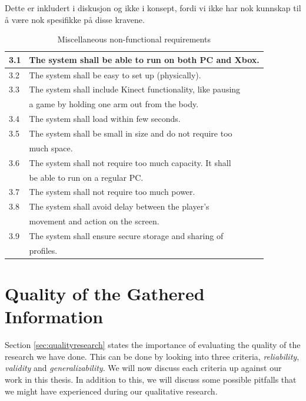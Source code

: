 Dette er inkludert i diskusjon og ikke i konsept, fordi vi ikke har nok kunnskap til å være nok spesifikke på disse kravene. 

\begin{table} [H]
\label{tab:nfunc2}
\centering
\begin{tabular}{|l|l|}
\hline
3.1 & The system shall be able to run on both PC and Xbox. \\ \hline
3.2 & The system shall be easy to set up (physically).\\ \hline
3.3 & The system shall include Kinect functionality, like pausing \\ & a game by holding one arm out from the body. \\ \hline
3.4 & The system shall load within few seconds.\\ \hline
3.5 & The system shall be small in size and do not require too \\&  much space.\\ \hline
3.6 & The system shall not require too much capacity. It shall \\ & be able to run on a regular PC. \\ \hline
3.7 & The system shall not require too much power. \\ \hline
3.8 & The system shall avoid delay between the player's \\ & movement and action on the screen.\\ \hline
3.9 & The system shall ensure secure storage and sharing of \\ & profiles. \\ \hline
\end{tabular}
\caption[Miscellaneous non-functional requirements]{Miscellaneous non-functional requirements}
\end{table} 

\section{Quality of the Gathered Information}
\label{sec:discQuality}

Section \ref{sec:qualityresearch} states the importance of evaluating the quality of the research we have done. This can be done by looking into three criteria, \emph{reliability}, \emph{validity} and \emph{generalizability}. We will now discuss each criteria up against our work in this thesis. In addition to this, we will discuss some possible pitfalls that we might have experienced during our qualitative research.  

